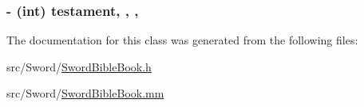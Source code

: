 \hypertarget{interface_sword_bible_book_a8911c7e1f406ce42f9095d385e8282b0}{
\subsubsection[{testament}]{\setlength{\rightskip}{0pt plus 5cm}-\/ (int) testament\hspace{0.3cm}{\ttfamily [read]}, {\ttfamily [write]}, {\ttfamily [atomic]}, {\ttfamily [assign]}}}\label{interface_sword_bible_book_a8911c7e1f406ce42f9095d385e8282b0}


The documentation for this class was generated from the following files\-:\begin{DoxyCompactItemize}
\item 
src/\-Sword/\hyperlink{_sword_bible_book_8h}{Sword\-Bible\-Book.\-h}\item 
src/\-Sword/\hyperlink{_sword_bible_book_8mm}{Sword\-Bible\-Book.\-mm}\end{DoxyCompactItemize}
